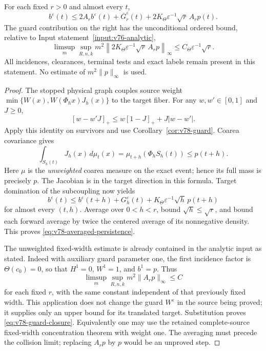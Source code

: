 \begin{theorem}
\label{thm:v78-separation}
For each fixed $r>0$ and almost every $t$,
\begin{equation}\label{eq:v78-averaged-persistence}
 b^\varepsilon(t)\le 2A_rb^\varepsilon(t)
       +\overline G_r^\varepsilon(t)
       +2K_\Theta\varepsilon^{-1}\sqrt r\,A_rp(t).
\end{equation}
The guard contribution on the right has the unconditional ordered
bound, relative to Input statement~\ref{input:v76-analytic},
\begin{equation}\label{eq:v78-guard-closure}
 \limsup_m\sup_{R,n,k}m^2\left\|
    2K_\Theta\varepsilon^{-1}\sqrt r\,A_rp\right\|_\infty
       \le C_\Theta\varepsilon^{-1}\sqrt r.
\end{equation}
All incidences, clearances, terminal tests and exact labels remain
present in this statement. No estimate of $m^2\|p\|_\infty$ is used.
\end{theorem}
\begin{proof}
The stopped physical graph couples source weight
$\min\{W(x),W(\Phi_hx)J_h(x)\}$ to the target fiber. For any
$w,w'\in[0,1]$ and $J\ge0$,
\[
 [w-w'J]_+\le w[1-J]_++J|w-w'|.
\]
Apply this identity on survivors and use
Corollary~\ref{cor:v78-guard}. Coarea covariance gives
\[
 \int_{S_h(t)}J_h(x)\,d\mu_t(x)
       =\mu_{t+h}(\Phi_hS_h(t))\le p(t+h).
\]
Here $\mu$ is the \emph{unweighted} coarea measure on the exact
event; hence its full mass is precisely $p$. The Jacobian is in
the target direction in this formula. Target domination of the
subcoupling now yields
\[
 b^\varepsilon(t)\le b^\varepsilon(t+h)+G_h^\varepsilon(t)
            +K_\Theta\varepsilon^{-1}\sqrt h\,p(t+h)
\]
for almost every $(t,h)$. Average over $0<h<r$, bound
$\sqrt h\le\sqrt r$, and bound each forward average by twice the
centered average of its nonnegative density. This proves
\eqref{eq:v78-averaged-persistence}.

The unweighted fixed-width estimate is already contained in the
analytic input as stated. Indeed with auxiliary guard parameter
one, the first incidence factor is $\Theta(c_0)=0$, so that
$H^1=0$, $W^1=1$, and $b^1=p$. Thus
\[
 \limsup_m\sup_{R,n,k}m^2\|A_rp\|_\infty\le C
\]
for each fixed $r$, with the same constant independent of that
previously fixed width. This application does not change the guard
$W^\varepsilon$ in the source being proved; it supplies only an
upper bound for its translated target. Substitution proves
\eqref{eq:v78-guard-closure}. Equivalently one may use the retained
complete-source fixed-width concentration theorem with weight one.
The averaging must precede the collision limit; replacing $A_rp$
by $p$ would be an unproved step.
\end{proof}

